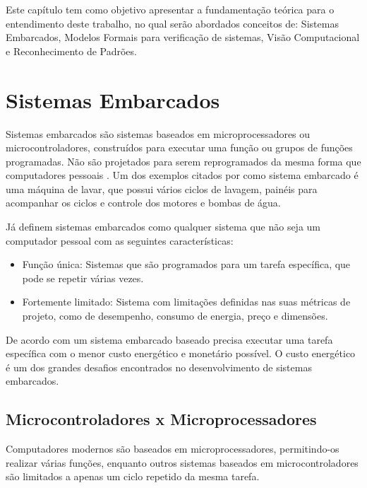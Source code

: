 
\label{chap:fund_teo}
	Este capítulo tem como objetivo apresentar a fundamentação teórica para o entendimento deste trabalho, no qual serão abordados conceitos de: Sistemas Embarcados, Modelos Formais para verificação de sistemas, Visão Computacional e Reconhecimento de Padrões.
  
    
\section{Sistemas Embarcados} 
Sistemas embarcados são sistemas baseados em microprocessadores ou microcontroladores, construídos para executar uma função ou grupos de funções programadas. Não são projetados para serem reprogramados da mesma forma que computadores pessoais \cite{heath:2002}.
Um dos exemplos citados por \cite{heath:2002} como sistema embarcado é uma máquina de lavar, que possui vários ciclos de lavagem, painéis para acompanhar os ciclos e controle dos motores e bombas de água.
    
Já  definem sistemas embarcados como qualquer sistema que não seja um computador pessoal com as seguintes características:\begin{itemize}
\item Função única: Sistemas que são programados para um tarefa específica, que pode se repetir várias vezes.
\item Fortemente limitado: Sistema com limitações definidas nas suas métricas de projeto, como de desempenho, consumo de energia, preço e dimensões.
\end{itemize}

De acordo com   um sistema embarcado baseado precisa executar uma tarefa específica com o menor custo energético e monetário possível. O custo energético é um dos grandes desafios encontrados no desenvolvimento de sistemas embarcados.
 

\subsection{Microcontroladores x Microprocessadores}
 Computadores modernos são baseados em microprocessadores, permitindo-os realizar várias funções, enquanto outros sistemas baseados em microcontroladores são limitados a apenas um ciclo repetido da mesma tarefa.\cite{heath:2002}
 
